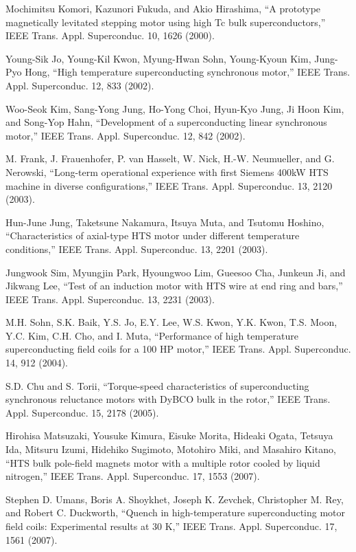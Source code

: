 \noindent [9.218] Mochimitsu Komori, Kazunori Fukuda, and Akio Hirashima, ``A prototype magnetically
levitated stepping motor using high Tc bulk superconductors,” IEEE
Trans. Appl. Superconduc. 10, 1626 (2000).

\noindent [9.219] Young-Sik Jo, Young-Kil Kwon, Myung-Hwan Sohn, Young-Kyoun Kim, Jung-
Pyo Hong, ``High temperature superconducting synchronous motor,” IEEE Trans.
Appl. Superconduc. 12, 833 (2002).

\noindent [9.220] Woo-Seok Kim, Sang-Yong Jung, Ho-Yong Choi, Hyun-Kyo Jung, Ji Hoon Kim,
and Song-Yop Hahn, ``Development of a superconducting linear synchronous motor,”
IEEE Trans. Appl. Superconduc. 12, 842 (2002).

\noindent [9.221] M. Frank, J. Frauenhofer, P. van Hasselt, W. Nick, H.-W. Neumueller, and G. Nerowski,
``Long-term operational experience with first Siemens 400kW HTS machine
in diverse configurations,” IEEE Trans. Appl. Superconduc. 13, 2120 (2003).

\noindent [9.222] Hun-June Jung, Taketsune Nakamura, Itsuya Muta, and Tsutomu Hoshino,
``Characteristics of axial-type HTS motor under different temperature conditions,”
IEEE Trans. Appl. Superconduc. 13, 2201 (2003).

\noindent [9.223] Jungwook Sim, Myungjin Park, Hyoungwoo Lim, Gueesoo Cha, Junkeun Ji, and
Jikwang Lee, ``Test of an induction motor with HTS wire at end ring and bars,”
IEEE Trans. Appl. Superconduc. 13, 2231 (2003).

\noindent [9.224] M.H. Sohn, S.K. Baik, Y.S. Jo, E.Y. Lee, W.S. Kwon, Y.K. Kwon, T.S. Moon, Y.C.
Kim, C.H. Cho, and I. Muta, ``Performance of high temperature superconducting
field coils for a 100 HP motor,” IEEE Trans. Appl. Superconduc. 14, 912 (2004).

\noindent [9.225] S.D. Chu and S. Torii, ``Torque-speed characteristics of superconducting synchronous
reluctance motors with DyBCO bulk in the rotor,” IEEE Trans. Appl.
Superconduc. 15, 2178 (2005).

\noindent [9.226] Hirohisa Matsuzaki, Yousuke Kimura, Eisuke Morita, Hideaki Ogata, Tetsuya Ida,
Mitsuru Izumi, Hidehiko Sugimoto, Motohiro Miki, and Masahiro Kitano, ``HTS
bulk pole-field magnets motor with a multiple rotor cooled by liquid nitrogen,”
IEEE Trans. Appl. Superconduc. 17, 1553 (2007).

\noindent [9.227] Stephen D. Umans, Boris A. Shoykhet, Joseph K. Zevchek, Christopher M. Rey,
and Robert C. Duckworth, ``Quench in high-temperature superconducting motor
field coils: Experimental results at 30 K,” IEEE Trans. Appl. Superconduc. 17,
1561 (2007).


